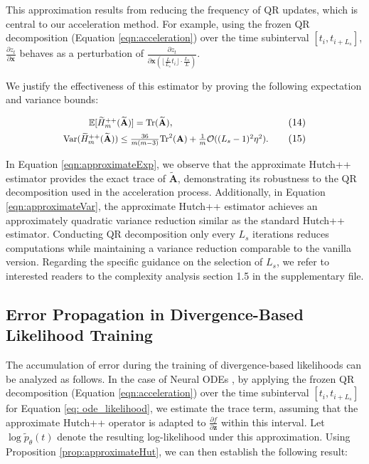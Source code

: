 This approximation results from reducing the frequency of QR updates, which is central to our acceleration method. For example, using the frozen QR decomposition (Equation \ref{eqn:acceleration}) over the time subinterval $[t_i, t_{i+L_s}]$, $\frac{\partial z_t}{\partial \mathbf{x}}$ behaves as a perturbation of $\frac{\partial z_t}{\partial \mathbf{x}\left(\lfloor\frac{L}{L_s} t_i\rfloor \cdot \frac{L_s}{L}\right)}$.

We justify the effectiveness of this estimator by proving the following expectation and variance bounds:
\begin{proposition}\label{prop:approximateHut}
\begin{align}
\scalebox{0.9}{$
    \mathbb{E}[\widetilde{H}_m^{++}(\widetilde{\mathbf{A}})] = \mathrm{Tr}(\widetilde{\mathbf{A}})$},\hspace{3.35cm}\tag{14}\label{eqn:approximateExp}\\
\scalebox{0.9}{$
    \mathrm{Var}(\widetilde{H}_m^{++}(\widetilde{\mathbf{A}})) \le \frac{36}{m(m-3)} \mathrm{Tr}^2(\mathbf{A}) +  \frac{1}{m}\mathcal{O}((L_s-1)^2\eta^2).$}\tag{15}\label{eqn:approximateVar}
\end{align}
\end{proposition}
In Equation \ref{eqn:approximateExp}, we observe that the approximate Hutch++ estimator provides the exact trace of $\tilde{\mathbf{A}}$, demonstrating its robustness to the QR decomposition used in the acceleration process. Additionally, in Equation \ref{eqn:approximateVar}, the approximate Hutch++ estimator achieves an approximately quadratic variance reduction similar as the standard Hutch++ estimator.  
Conducting QR decomposition only every \(L_s\) iterations reduces computations while maintaining a variance reduction comparable to the vanilla version. Regarding the specific guidance on the selection of \(L_s\), we refer to interested readers to the complexity analysis section 1.5 in the supplementary file.


\subsection{Error Propagation in Divergence-Based Likelihood Training}\label{sec: error_propagation}

The accumulation of error during the training of divergence-based likelihoods can be analyzed as follows. In the case of Neural ODEs \cite{neural_ode}, by applying the frozen QR decomposition (Equation \ref{eqn:acceleration}) over the time subinterval \( [t_i, t_{i+L_s}] \) for Equation \ref{eq: ode_likelihood}, we estimate the trace term, assuming that the approximate Hutch++ operator is adapted to \( \frac{\partial f}{\partial \mathbf{z}} \) within this interval. Let \( \log \tilde{p}_\theta(t) \) denote the resulting log-likelihood under this approximation. Using Proposition \ref{prop:approximateHut}, we can then establish the following result:

